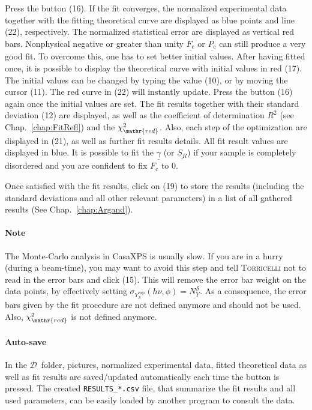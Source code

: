 \documentclass[oldfontcommands,openany,oneside]{memoir}
\newcommand{\dirData}[1]{{\fontsize{9}{0}\selectfont\faFolderOpenO$\mathcal{D}$}$\,${\fontsize{7}{0}\selectfont\faCaretRight}\directory{#1}}
\begin{document}
Press the  button (16). If the fit converges, the normalized experimental data together with the fitting theoretical curve are displayed as blue points and line (22), respectively. The normalized statistical error are displayed as vertical red bars. Nonphysical negative or greater than unity $\underline{F_\mathrm{c}}$ or $\underline{P_\mathrm{c}}$ can still produce a very good fit. To overcome this, one has to set better initial values. After having fitted once, it is possible to display the theoretical curve with initial values in red (17). The initial values can be changed by typing the value (10), or by moving the cursor (11). The red curve in (22) will instantly update. Press the  button (16) again once the initial values are set. The fit results together with their standard deviation (12) are displayed, as well as the coefficient of determination $R^2$ (see Chap.~\ref{chap:FitRefl}) and the $\chi_\mathr{red}^2$. Also, each step of the optimization are displayed in (21), as well as further fit results details. All fit result values are displayed in blue. It is possible to fit the $\underline{\gamma}$ (or $\underline{S_R}$) if your sample is completely disordered and you are confident to fix $F_\mathrm{c}$ to 0.

Once satisfied with the fit results, click on  (19) to store the results (including the standard deviations and all other relevant parameters) in a list of all gathered results (See Chap.~\ref{chap:Argand}).


\paragraph{Note} The Monte-Carlo analysis in CasaXPS is usually slow. If you are in a hurry (during a beam-time), you may want to avoid this step and tell \textsc{Torricelli} not to read in the error bars and click  (15). This will remove the error bar weight on the data points, by effectively setting $\sigma_{Y^\mathrm{exp}_\mathscr{S}}(h\nu, \phi)=\underline{N_Y^\mathscr{S}}$. As a consequence, the error bars given by the fit procedure are not defined anymore and should not be used. Also, $\chi_\mathr{red}^2$ is not defined anymore.

\paragraph{Auto-save} In the \dirData{results} folder, pictures, normalized experimental data, fitted theoretical data as well as fit results are saved/updated automatically each time the  button is pressed. The created \texttt{RESULTS\_*.csv} file, that summarize the fit results and all used parameters, can be easily loaded by another program to consult the data.
\end{document}
